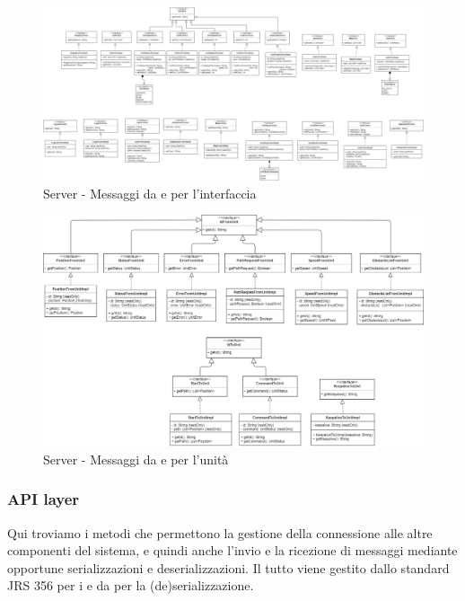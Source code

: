 \begin{landscape}
    \begin{figure}[H]
        \centering
        \includegraphics[width=24cm]{img/server_from_to_ui.png}
        \caption{Server - Messaggi da e per l'interfaccia}
    \end{figure}
\end{landscape}

\begin{landscape}
    \begin{figure}[H]
        \centering
        \includegraphics[width=24cm]{img/server_from_to_unit.png}
        \caption{Server - Messaggi da e per l'unità}
    \end{figure}
\end{landscape}

\subsubsection{API layer}
Qui troviamo i metodi che permettono la gestione della connessione alle altre componenti del sistema, e quindi anche l'invio e la ricezione di messaggi mediante opportune serializzazioni e deserializzazioni. Il tutto viene gestito dallo standard JRS 356 per i  e da  per la (de)serializzazione.

